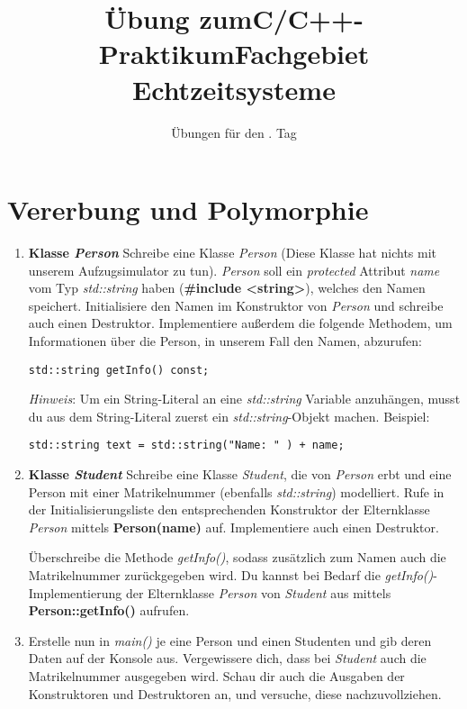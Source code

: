 \documentclass[
  accentcolor=tud1c,	%
  colorbacktitle,		%
  inverttitle,			%
  german,				%
  twoside
]{tudexercise}
\title{Übung zum\linebreak[1]C/C++-Praktikum\linebreak[1] Fachgebiet Echtzeitsysteme}
\subtitle{Übungen für den \tag{}. Tag}
\newcommand{\tag}{3}
\begin{document}
\begin{examheader}
	\textmb{Übung zum C/C++-Praktikum - Tag \tag{}}
\end{examheader}
\maketitle 

\vspace{5mm}

\section{Vererbung und Polymorphie}
\begin{enumerate}
\item \textbf{Klasse \emph{Person}}
Schreibe eine Klasse \emph{Person} (Diese Klasse hat nichts mit unserem Aufzugsimulator zu tun).
\emph{Person} soll ein \emph{protected} Attribut \emph{name} vom Typ \emph{std::string} haben (\textbf{\#include <string>}), welches den Namen speichert. 
Initialisiere den Namen im Konstruktor von \emph{Person} und schreibe auch einen Destruktor.
Implementiere außerdem die folgende Methodem, um Informationen über die Person, in unserem Fall den Namen, abzurufen:
\begin{lstlisting}
std::string getInfo() const;
\end{lstlisting}

\emph{Hinweis}: Um ein String-Literal an eine \emph{std::string} Variable anzuhängen, musst du aus dem String-Literal zuerst ein \emph{std::string}-Objekt machen.
Beispiel:
\begin{lstlisting}
std::string text = std::string("Name: " ) + name;
\end{lstlisting}

\item \textbf{Klasse \emph{Student}}
Schreibe eine Klasse \emph{Student}, die von \emph{Person} erbt und eine Person mit einer Matrikelnummer (ebenfalls \emph{std::string}) modelliert.
Rufe in der Initialisierungsliste den entsprechenden Konstruktor der Elternklasse \emph{Person} mittels \textbf{Person(name)} auf.
Implementiere auch einen Destruktor. 

Überschreibe die Methode \emph{getInfo()}, sodass zusätzlich zum Namen auch die Matrikelnummer zurückgegeben wird.
Du kannst bei Bedarf die \emph{getInfo()}-Implementierung der Elternklasse \emph{Person} von \emph{Student} aus mittels \textbf{Person::getInfo()} aufrufen.

\item 
Erstelle nun in \emph{main()} je eine Person und einen Studenten und gib deren Daten auf der Konsole aus.
Vergewissere dich, dass bei \emph{Student} auch die Matrikelnummer ausgegeben wird.
Schau dir auch die Ausgaben der Konstruktoren und Destruktoren an, und versuche, diese nachzuvollziehen.


\end{enumerate}
\end{document}
